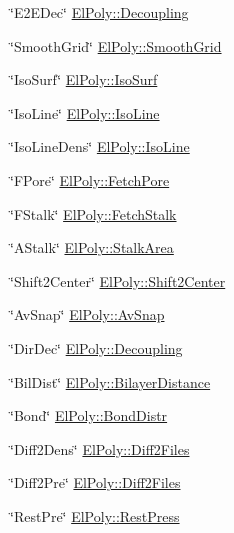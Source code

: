 \begin{DoxyItemize}
\item \char`\"{}\+E2\+E\+Dec\char`\"{} \hyperlink{classElPoly_a44e20767e332d941b94906f1a8e60e24}{El\+Poly\+::\+Decoupling} 
\item \char`\"{}\+Smooth\+Grid\char`\"{} \hyperlink{classVarData_a3d0e967c8f2515c16170245de47ffcbe}{El\+Poly\+::\+Smooth\+Grid} 
\item \char`\"{}\+Iso\+Surf\char`\"{} \hyperlink{classElPoly_a23b08e53b2acd3090051d2034632c20f}{El\+Poly\+::\+Iso\+Surf} 
\item \char`\"{}\+Iso\+Line\char`\"{} \hyperlink{classElPoly_a7af346569b401863e3d5f4541e85e0c4}{El\+Poly\+::\+Iso\+Line} 
\item \char`\"{}\+Iso\+Line\+Dens\char`\"{} \hyperlink{classElPoly_a7af346569b401863e3d5f4541e85e0c4}{El\+Poly\+::\+Iso\+Line} 
\item \char`\"{}\+F\+Pore\char`\"{} \hyperlink{classElPoly_aecd33584d71ae498798338253cbf83f0}{El\+Poly\+::\+Fetch\+Pore} 
\item \char`\"{}\+F\+Stalk\char`\"{} \hyperlink{classElPoly_a21a28de0471580af1978c3a48ae0ba0e}{El\+Poly\+::\+Fetch\+Stalk} 
\item \char`\"{}\+A\+Stalk\char`\"{} \hyperlink{classElPoly_a099625012512857cb5524bf15b397e5e}{El\+Poly\+::\+Stalk\+Area} 
\item \char`\"{}\+Shift2\+Center\char`\"{} \hyperlink{classElPoly_a2d5b51a7f120a4104f6e5070ca6c55f5}{El\+Poly\+::\+Shift2\+Center} 
\item \char`\"{}\+Av\+Snap\char`\"{} \hyperlink{classElPoly_aafe33ef0f28995ba7c1a778196decf9b}{El\+Poly\+::\+Av\+Snap} 
\item \char`\"{}\+Dir\+Dec\char`\"{} \hyperlink{classElPoly_a44e20767e332d941b94906f1a8e60e24}{El\+Poly\+::\+Decoupling} 
\item \char`\"{}\+Bil\+Dist\char`\"{} \hyperlink{classElPoly_a6f1477b110e5ee0e7e027466dac51b69}{El\+Poly\+::\+Bilayer\+Distance} 
\item \char`\"{}\+Bond\char`\"{} \hyperlink{classElPoly_a932a57ab32bd20f60bce8b498ca3095d}{El\+Poly\+::\+Bond\+Distr} 
\item \char`\"{}\+Diff2\+Dens\char`\"{} \hyperlink{classElPoly_a1c3688dd2704504d159802de5815643d}{El\+Poly\+::\+Diff2\+Files} 
\item \char`\"{}\+Diff2\+Pre\char`\"{} \hyperlink{classElPoly_a1c3688dd2704504d159802de5815643d}{El\+Poly\+::\+Diff2\+Files} 
\item \char`\"{}\+Rest\+Pre\char`\"{} \hyperlink{classElPoly_a019d255b1ff857ccd34550c7409a595b}{El\+Poly\+::\+Rest\+Press} 

\end{DoxyItemize}

